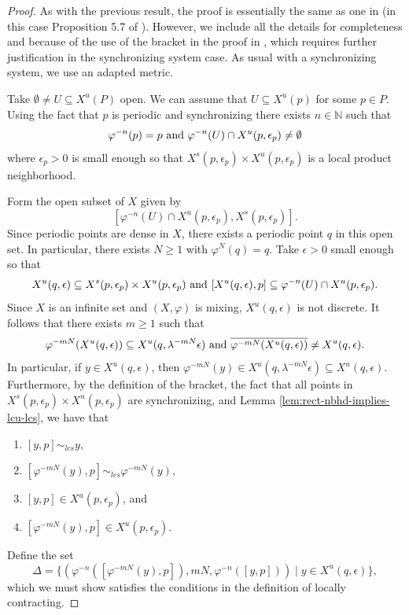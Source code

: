 \documentclass{amsart}
\newcommand{\N}{\mathbb{N}}
\theoremstyle{plain}
\theoremstyle{definition}
\theoremstyle{remark}
\begin{document}
\begin{proof}
As with the previous result, the proof is essentially the same as one in \cite{putnam99} (in this case Proposition 5.7 of \cite{putnam99}). However, we include all the details for completeness and because of the use of the bracket in the proof in \cite{putnam99}, which requires further justification in the synchronizing system case. As usual with a synchronizing system, we use an adapted metric.

Take $\emptyset \neq U \subseteq X^u(P)$ open. We can assume that $U \subseteq X^u(p)$ for some $p\in P$. Using the fact that $p$ is periodic and synchronizing there exists $n\in \N$ such that 
\[
\varphi^{-n}(p)=p \hbox{ and }\varphi^{-n}(U) \cap X^u(p, \epsilon_p) \neq \emptyset 
\]
where $\epsilon_p>0$ is small enough so that $X^s(p, \epsilon_p) \times X^u(p, \epsilon_p)$ is a local product neighborhood.

Form the open subset of $X$ given by
\[
[ \varphi^{-n}(U) \cap X^u(p, \epsilon_p), X^s(p, \epsilon_p) ].
\]
Since periodic points are dense in $X$, there exists a periodic point $q$ in this open set. In particular, there exists $N\ge 1$ with $\varphi^N(q)=q$. Take $\epsilon>0$ small enough so that 
\[
X^u(q, \epsilon) \subseteq X^s(p, \epsilon_p) \times X^u(p, \epsilon_p) \hbox{ and }[X^u(q, \epsilon), p] \subseteq \varphi^{-n}(U) \cap X^u(p, \epsilon_p).
\]
Since $X$ is an infinite set and $(X, \varphi)$ is mixing, $X^u(q, \epsilon)$ is not discrete. It follows that there exists $m \geq 1$ such that 
\begin{equation} \label{contractingEquation}
\varphi^{-mN}(X^u(q, \epsilon)) \subseteq X^u(q, \lambda^{-mN}\epsilon) \hbox{ and }\overline{\varphi^{-mN}(X^u(q, \epsilon))} \neq X^u(q, \epsilon).
\end{equation}
In particular, if $y \in X^u(q, \epsilon)$, then $\varphi^{-mN}(y) \in X^u(q, \lambda^{-mN}\epsilon) \subseteq X^u(q, \epsilon)$. Furthermore, by the definition of the bracket, the fact that all points in $X^s(p, \epsilon_p) \times X^u(p, \epsilon_p)$ are synchronizing, and Lemma \ref{lem:rect-nbhd-implies-lcu-lcs}, we have that
\begin{enumerate}
\item $[ y , p ] \sim_{lcs} y$, 
\item $[ \varphi^{-mN}(y), p ] \sim_{lcs} \varphi^{-mN}(y)$, 
\item $[ y, p] \in X^u(p, \epsilon_p)$, and
\item $[\varphi^{-mN}(y), p] \in X^u(p, \epsilon_p)$.
\end{enumerate}
Define the set
\[
\Delta = \{ (\varphi^{-n}([\varphi^{-mN}(y), p]), mN, \varphi^{-n}([y, p]) ) \mid y \in X^u(q, \epsilon)  \}, 
\]
which we must show satisfies the conditions in the definition of locally contracting. 


\end{proof}
\end{document}
